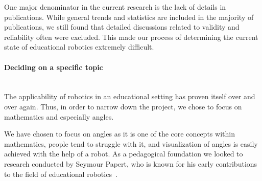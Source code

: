 \bigskip\noindent
One major denominator in the current research is the lack of details in publications. While general trends and statistics are included in the majority of publications, we still found that detailed discussions related to validity and reliability often were excluded. This made our process of determining the current state of educational robotics extremely difficult. 


\paragraph{Deciding on a specific topic}\label{sec:decideTopic}~\\
The applicability of robotics in an educational setting has proven itself over and over again. Thus, in order to narrow down the project, we chose to focus on mathematics and especially angles. 

\bigskip\noindent
We have chosen to focus on angles as it is one of the core concepts within mathematics, people tend to struggle with it, and visualization of angles is easily achieved with the help of a robot. %
%
As a pedagogical foundation we looked to research conducted by Seymour Papert, who is known for his early contributions to the field of educational robotics~\cite{papert1980mindstorms,papertGrant}.


